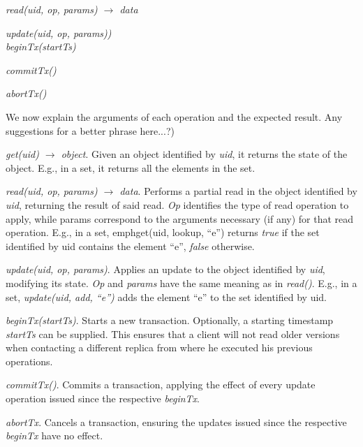 \documentclass{vldb}
\newcommand{\grumbler}[2]{{\color{red}{\bf #1:} #2}}
\renewcommand{\grumbler}[2]{}
\newcommand{\andre}[1]{\grumbler{andre}{#1}}
\newcommand{\emphvspace}{0.5\baselineskip}
\newcommand{\middleblockemph}[1]{\hspace{2em}\emph{#1}}
\newcommand{\lastblockemph}[1]{\hspace{2em}\emph{#1}\vspace{\emphvspace}}
\begin{document}
\middleblockemph{read(uid, op, params) $\rightarrow$ data}

\middleblockemph{update(uid, op, params))} \\

\middleblockemph{beginTx(startTs)}

\middleblockemph{commitTx()}

\lastblockemph{abortTx()}

We now explain the arguments of each operation and the expected result.
\andre(Any suggestions for a better phrase here...?)

\emph{get(uid) $\rightarrow$ object}. Given an object identified by \emph{uid}, it returns the state of the object.
E.g., in a set, it returns all the elements in the set.

\emph{read(uid, op, params) $\rightarrow$ data}. Performs a partial read in the object identified by \emph{uid}, returning the result of said read. 
\emph{Op} identifies the type of read operation to apply, while params correspond to the arguments necessary (if any) for that read operation.
E.g., in a set, emph{get(uid, lookup, ``e'')} returns \emph{true} if the set identified by uid contains the element ``e'', \emph{false} otherwise.

\emph{update(uid, op, params)}. Applies an update to the object identified by \emph{uid}, modifying its state.
\emph{Op} and \emph{params} have the same meaning as in \emph{read()}.
E.g., in a set, \emph{update(uid, add, ``e'')} adds the element ``e'' to the set identified by uid.

\emph{beginTx(startTs)}. Starts a new transaction. Optionally, a starting timestamp \emph{startTs} can be supplied. This ensures that a client will not read older versions when contacting a different replica from where he executed his previous operations.
\andre{TODO: Add reference to some place where I explain this properly...?}

\emph{commitTx()}. Commits a transaction, applying the effect of every update operation issued since the respective \emph{beginTx}.

\emph{abortTx}. Cancels a transaction, ensuring the updates issued since the respective \emph{beginTx} have no effect.

\andre{I think somewhere I'll have to explain the following: a) how beginTx works when receiving a startTs; b) how are commits/aborts handled (i.e., when updates are applied); c) that reads return right away and consider the temporary effects of updates issued in that transaction}
\end{document}
